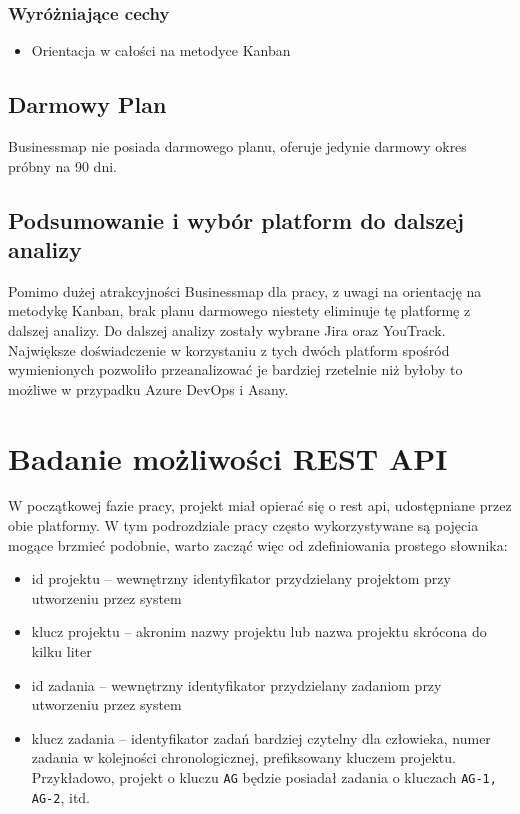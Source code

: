 \subsubsection*{Wyróżniające cechy}
\begin{itemize}
    \item Orientacja w całości na metodyce Kanban
\end{itemize}
\subsection*{Darmowy Plan}
Businessmap nie posiada darmowego planu, oferuje jedynie darmowy okres próbny na 90 dni.

\subsection*{Podsumowanie i wybór platform do dalszej analizy}
Pomimo dużej atrakcyjności Businessmap dla pracy, z uwagi na orientację na metodykę Kanban, brak planu darmowego niestety eliminuje tę platformę z dalszej analizy.
Do dalszej analizy zostały wybrane Jira oraz YouTrack. Największe doświadczenie w korzystaniu z tych dwóch platform spośród wymienionych pozwoliło przeanalizować je bardziej rzetelnie
niż byłoby to możliwe w przypadku Azure DevOps i Asany.

\section*{Badanie możliwości REST API}
W początkowej fazie pracy, projekt miał opierać się o rest api, udostępniane przez obie platformy. \cite{JiraApiDocumentation} \cite{YouTrackApiDocumentation}
W tym podrozdziale pracy często wykorzystywane są pojęcia mogące brzmieć podobnie, warto zacząć więc od zdefiniowania prostego słownika:
\begin{itemize}
    \item id projektu -- wewnętrzny identyfikator przydzielany projektom przy utworzeniu przez system
    \item klucz projektu -- akronim nazwy projektu lub nazwa projektu skrócona do kilku liter
    \item id zadania -- wewnętrzny identyfikator przydzielany zadaniom przy utworzeniu przez system
    \item klucz zadania -- identyfikator zadań bardziej czytelny dla człowieka, numer zadania w kolejności chronologicznej, prefiksowany kluczem projektu.
    Przykładowo, projekt o kluczu \texttt{AG} będzie posiadał zadania o kluczach \texttt{AG-1, AG-2}, itd.
\end{itemize}

